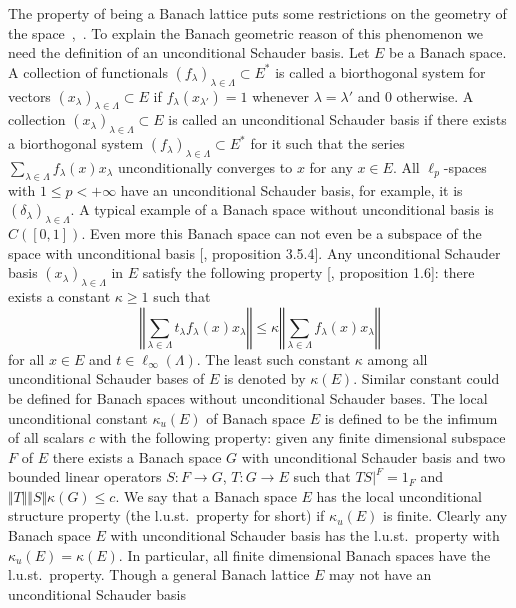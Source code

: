 The property of being a Banach lattice puts some restrictions on the geometry of
the space~\cite{SherOrderInOpAlg},~\cite{KadOrderPropOfBoundSAOps}. To explain
the Banach geometric reason of this phenomenon we need the definition of an
unconditional Schauder basis. Let $E$ be a Banach space. A collection of
functionals ${(f_\lambda)}_{\lambda\in\Lambda}\subset E^*$ is called 
a biorthogonal system for vectors ${(x_\lambda)}_{\lambda\in\Lambda}\subset E$ 
if $f_\lambda(x_{\lambda'})=1$ whenever $\lambda=\lambda'$ 
and $0$ otherwise. A collection ${(x_\lambda)}_{\lambda\in\Lambda}\subset E$ 
is called an unconditional Schauder basis if there exists 
a biorthogonal system ${(f_\lambda)}_{\lambda\in\Lambda}\subset E^*$ 
for it such that the series $\sum_{\lambda\in\Lambda} f_\lambda(x)x_\lambda$ 
unconditionally converges to $x$ for any $x\in E$. All $\ell_p$-spaces 
with $1\leq p<+\infty$ have an unconditional Schauder basis, for example, it is
${(\delta_\lambda)}_{\lambda\in\Lambda}$. A typical example of a Banach space without
unconditional basis is $C([0,1])$. Even more this Banach space can not even be a
subspace of the space with unconditional basis [\cite{KalAlbTopicsBanSpTh},
proposition 3.5.4].  Any unconditional Schauder basis
${(x_\lambda)}_{\lambda\in\Lambda}$ in $E$ satisfy the following property
[\cite{DiestAbsSumOps}, proposition 1.6]: there exists a constant $\kappa\geq 1$
such that
$$
\left\Vert \sum_{\lambda\in\Lambda}t_\lambda f_\lambda(x)x_\lambda\right\Vert
\leq
\kappa\left\Vert \sum_{\lambda\in\Lambda}f_\lambda(x)x_\lambda\right\Vert
$$
for all $x\in E$ and $t\in\ell_\infty(\Lambda)$. The least such constant
$\kappa$ among all unconditional Schauder bases of $E$ is denoted by
$\kappa(E)$. Similar constant could be defined for Banach spaces without
unconditional Schauder bases. The local unconditional constant $\kappa_u(E)$ of
Banach space $E$ is defined to be the infimum of all scalars $c$ with the
following property: given any finite dimensional subspace $F$ of $E$ there
exists a Banach space $G$ with unconditional Schauder basis and two bounded
linear operators $S:F\to G$, $T:G\to E$ such that $TS|^{F}=1_F$ and $\Vert
T\Vert\Vert S\Vert\kappa(G)\leq c$. We say that a Banach space $E$ has the local
unconditional structure property (the l.u.st.\ property for short) if
$\kappa_u(E)$ is finite. Clearly any Banach space $E$ with unconditional
Schauder basis has the l.u.st.\ property with $\kappa_u(E)=\kappa(E)$. In
particular, all finite dimensional Banach spaces have the l.u.st.\ property.
Though a general Banach lattice $E$ may not have an unconditional Schauder basis
